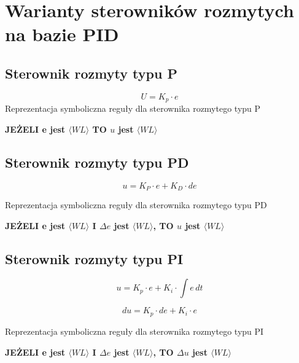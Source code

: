 
	
	\section{Warianty sterowników rozmytych na bazie PID}
\subsection{Sterownik rozmyty typu P}
\begin{frame}
	\centering 
	\begin{equation}
		U = K_p \cdot e
	\end{equation}
	Reprezentacja symboliczna reguły dla sterownika rozmytego typu P \bigskip
	

	\textbf{JEŻELI e jest $\langle WL \rangle$ TO $u$ jest $\langle WL \rangle$}
\end{frame}

\subsection{Sterownik rozmyty typu PD}
\begin{frame}
	\centering
	
	\begin{equation}
		u=K_P \cdot e + K_D \cdot de
	\end{equation}
	
	Reprezentacja symboliczna reguły dla sterownika rozmytego typu PD \bigskip
	
	\textbf{JEŻELI e jest $\langle WL \rangle$ I $\Delta e$ jest $\langle WL \rangle$,  TO $u$ jest $\langle WL \rangle$}
\end{frame}

\subsection{Sterownik rozmyty typu PI}
\begin{frame}
	\centering

	\begin{equation}
		u=K_p \cdot e +K_i \cdot \int\!\! e\, dt
	\end{equation}
	
	\begin{equation}
		du = K_p \cdot de + K_i \cdot e
	\end{equation}
	
	Reprezentacja symboliczna reguły dla sterownika rozmytego typu PI \bigskip
	
	\textbf{JEŻELI e jest $\langle WL \rangle$ I $\Delta e$ jest $\langle WL \rangle$,  TO $\Delta u$ jest $\langle WL \rangle$}
\end{frame}
	
